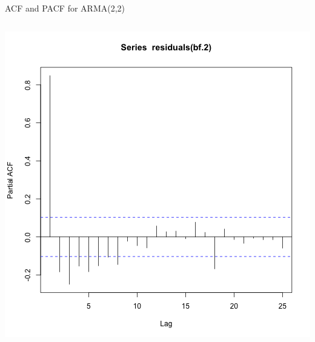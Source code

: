 \documentclass{beamer}
\begin{document}
\begin{frame}[fragile]{ACF and PACF for ARMA(2,2)}
\begin{columns}
\begin{column}{0.5\textwidth}
      \includegraphics[width=\textwidth]{lectures/day_4_GLS/figures/unnamed-chunk-29-1.png}
      \end{column}
  \end{columns}
\end{frame}
\end{document}
